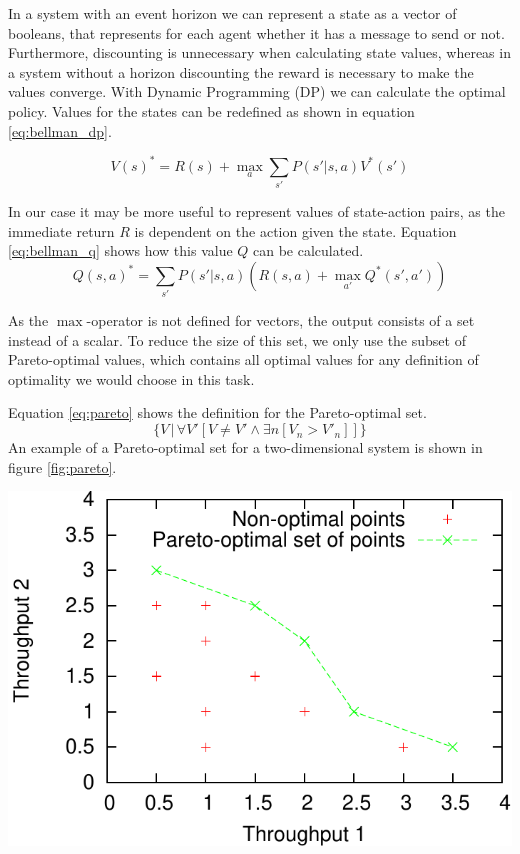 \documentclass{article}
\makeatletter
\newenvironment{figurehere}
{\def\@captype{figure}}
{}
\makeatother
\begin{document}
\begin{multicols}{2}
		In a system with an event horizon we can represent a state as a vector of
		booleans, that represents for each agent whether it has a message to send
		or not. Furthermore, discounting is unnecessary when calculating state
		values, whereas in a system without a horizon discounting the reward is
		necessary to make the values converge. With Dynamic Programming (DP) we
		can calculate the optimal policy. Values for the states can be redefined
		as shown in equation \ref{eq:bellman_dp}.

		\begin{equation}
		\displaystyle
		V(s)^* = R(s) + \max_a \sum_{s'} P(s'|s, a) V^*(s')
		\label{eq:bellman_dp}
		\end{equation}

		In our case it may be more useful to represent values of state-action
		pairs, as the immediate return $R$ is dependent on the action given the
		state. Equation \ref{eq:bellman_q} shows how this value $Q$ can be
		calculated.
		\begin{equation}
		\displaystyle
		Q(s, a)^* = \sum_{s'} P(s'|s, a) \left(R(s, a) + \max_{a'} Q^*(s', a')\right)
		\label{eq:bellman_q}
		\end{equation}

		As the $\max$-operator is not defined for vectors, the output consists of
		a set instead of a scalar. To reduce the size of this set, we only use
		the subset of Pareto-optimal values, which contains all optimal values
		for any definition of optimality we would choose in this task.

		Equation \ref{eq:pareto} shows the definition for the Pareto-optimal set.
		\begin{equation}
			\label{eq:pareto}
			\Big\{ V\, \Big| \, \forall V'[ V \neq V' \land \exists n [V_n > V'_n]] \Big\}
		\end{equation}
		An example of a Pareto-optimal set for a two-dimensional system is shown in
		figure \ref{fig:pareto}.

	\begin{figurehere}
		\centering
		\includegraphics[scale=0.68]{images/pareto}
	   \label{fig:pareto}
	\end{figurehere}


\end{multicols}
\end{document}
